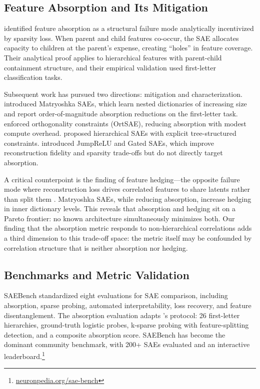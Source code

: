 \documentclass{article}
\begin{document}
\subsection{Feature Absorption and Its Mitigation}

\citet{chanin2024feature} identified feature absorption as a structural failure mode analytically incentivized by sparsity loss. When parent and child features co-occur, the SAE allocates capacity to children at the parent's expense, creating ``holes'' in feature coverage. Their analytical proof applies to hierarchical features with parent-child containment structure, and their empirical validation used first-letter classification tasks.

Subsequent work has pursued two directions: mitigation and characterization. \citet{bussmann2025matryoshka} introduced Matryoshka SAEs, which learn nested dictionaries of increasing size and report order-of-magnitude absorption reductions on the first-letter task. \citet{korznikov2026ortsae} enforced orthogonality constraints (OrtSAE), reducing absorption with modest compute overhead. \citet{zhan2026hierarchical} proposed hierarchical SAEs with explicit tree-structured constraints. \citet{rajamanoharan2024jumprelu} introduced JumpReLU and Gated SAEs, which improve reconstruction fidelity and sparsity trade-offs but do not directly target absorption.

A critical counterpoint is the finding of feature hedging---the opposite failure mode where reconstruction loss drives correlated features to share latents rather than split them \citep{chanin2025hedging}. Matryoshka SAEs, while reducing absorption, increase hedging in inner dictionary levels. This reveals that absorption and hedging sit on a Pareto frontier: no known architecture simultaneously minimizes both. Our finding that the absorption metric responds to non-hierarchical correlations adds a third dimension to this trade-off space: the metric itself may be confounded by correlation structure that is neither absorption nor hedging.

\subsection{Benchmarks and Metric Validation}

SAEBench \citep{karvonen2025saebench} standardized eight evaluations for SAE comparison, including absorption, sparse probing, automated interpretability, loss recovery, and feature disentanglement. The absorption evaluation adapts \citeauthor{chanin2024feature}'s protocol: 26 first-letter hierarchies, ground-truth logistic probes, k-sparse probing with feature-splitting detection, and a composite absorption score. SAEBench has become the dominant community benchmark, with 200+ SAEs evaluated and an interactive leaderboard.\footnote{\url{neuronpedia.org/sae-bench}}
\end{document}
